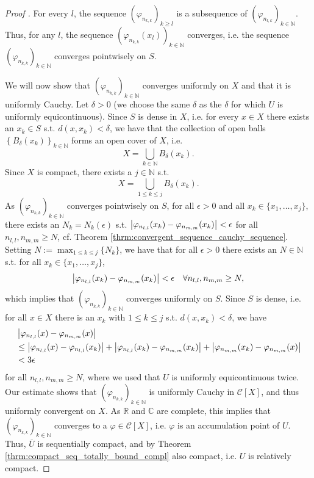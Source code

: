 \begin{proof}[Proof \cite{src:arzela_ascoli_theorem}]
	For every $l$, the sequence $\left(\varphi_{n_{k, k}}\right)_{k\geq l}$ is a subsequence of $\left(\varphi_{n_{l, k}}\right)_{k\in\mathbb N}$. Thus, for any $l$, the sequence $\left(\varphi_{n_{k, k}}(x_l)\right)_{k\in\mathbb N}$ converges, i.e. the sequence $\left(\varphi_{n_{k, k}}\right)_{k\in\mathbb N}$ converges pointwisely on $S$.
	
	We will now show that $\left(\varphi_{n_{k, k}}\right)_{k\in\mathbb N}$ converges uniformly on $X$ and that it is uniformly Cauchy. Let $\delta > 0$ (we choose the same $\delta$ as the $\delta$ for which $U$ is uniformly equicontinuous). Since $S$ is dense in $X$, i.e. for every $x\in X$ there exists an $x_k\in S$ s.t. $d(x, x_k) < \delta$, we have that the collection of open balls $\left\{B_{\delta}(x_k)\right\}_{k\in\mathbb N}$ forms an open cover of $X$, i.e. 
	\[
		X = \bigcup_{k\in\mathbb N}B_{\delta}(x_k).
	\]
	Since $X$ is compact, there exists a $j\in\mathbb N$ s.t. 
	\[
		X = \bigcup_{1\leq k\leq j}B_{\delta}(x_k).
	\]
	As $\left(\varphi_{n_{k, k}}\right)_{k\in\mathbb N}$ converges pointwisely on $S$, for all $\epsilon > 0$ and all $x_{k}\in \{x_1, \dots, x_{j}\}$, there exists an $N_k = N_k(\epsilon)$ s.t. $\left\vert \varphi_{n_{l, l}}(x_k) - \varphi_{n_{m, m}}(x_k) \right\vert < \epsilon$ for all $n_{l, l}, n_{m, m}\geq N$, cf. Theorem \ref{thrm:convergent_sequence_cauchy_sequence}. Setting $N := \max_{1\leq k\leq j}\{N_k\}$, we have that for all $\epsilon > 0$ there exists an $N \in\mathbb N$ s.t. for all $x_{k}\in \{x_1, \dots, x_j\}$, 
	\[
		\left\vert \varphi_{n_{l, l}}(x_k) - \varphi_{n_{m, m}}(x_k) \right\vert < \epsilon\quad\forall n_{l, l}, n_{m, m}\geq N,
	\]
	which implies that $\left(\varphi_{n_{k, k}}\right)_{k\in\mathbb N}$ converges uniformly on $S$. Since $S$ is dense, i.e. for all $x\in X$ there is an $x_{k}$ with $1\leq k\leq j$ s.t. $d(x, x_k) < \delta$, we have
	\begin{align*}
		&\left\vert \varphi_{n_{l, l}}(x) - \varphi_{n_{m, m}}(x) \right\vert 
		\\ &\leq \left\vert \varphi_{n_{l, l}}(x) - \varphi_{n_{l, l}}(x_k) \right\vert + \left\vert \varphi_{n_{l, l}}(x_k) - \varphi_{n_{m, m}}(x_k) \right\vert + \left\vert \varphi_{n_{m, m}}(x_k) - \varphi_{n_{m, m}}(x) \right\vert
		\\ &< 3\epsilon 
	\end{align*}
	for all $n_{l, l}, n_{m, m}\geq N$, where we used that $U$ is uniformly equicontinuous twice. Our estimate shows that $\left(\varphi_{n_{k, k}}\right)_{k\in\mathbb N}$ is uniformly Cauchy in $\mathcal C[X]$, and thus uniformly convergent on $X$. As $\mathbb R$ and $\mathbb C$ are complete, this implies that $\left(\varphi_{n_{k, k}}\right)_{k\in\mathbb N}$ converges to a $\varphi\in \mathcal C[X]$, i.e. $\varphi$ is an accumulation point of $U$. Thus, $\overline{U}$ is sequentially compact, and by Theorem \ref{thrm:compact_seq_totally_bound_compl} also compact, i.e. $U$ is relatively compact.
	

\end{proof}
